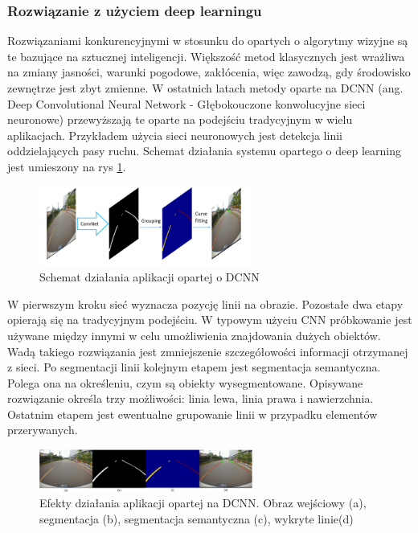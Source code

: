 \subsubsection{Rozwiązanie z użyciem deep learningu}
Rozwiązaniami konkurencyjnymi w stosunku do opartych o algorytmy wizyjne są te bazujące na sztucznej inteligencji. Większość metod klasycznych jest wrażliwa na zmiany jasności, warunki pogodowe, zakłócenia, więc zawodzą, gdy środowisko zewnętrze jest zbyt zmienne. 
W ostatnich latach metody oparte na DCNN (ang. Deep Convolutional Neural Network - Głębokouczone konwolucyjne sieci neuronowe) przewyższają te oparte na podejściu tradycyjnym w wielu aplikacjach. Przykładem użycia sieci neuronowych jest detekcja linii oddzielających pasy ruchu. Schemat działania systemu opartego o deep learning jest umieszony na rys \ref{fig:lane_detection3_cnn_general}.
\begin{figure}
  \centering
  \includegraphics[width=7cm]{img/lane_detection3_cnn_general.png}
  \caption{Schemat działania aplikacji opartej o DCNN\cite{T6}}
  \label{fig:lane_detection3_cnn_general}
\end{figure}
 W pierwszym kroku sieć wyznacza pozycję linii na obrazie. Pozostałe dwa etapy opierają się na tradycyjnym podejściu. W typowym użyciu CNN próbkowanie jest używane między innymi w celu umożliwienia znajdowania dużych obiektów. Wadą takiego rozwiązania jest zmniejszenie szczegółowości informacji otrzymanej z sieci.
Po segmentacji linii kolejnym etapem jest segmentacja semantyczna. Polega ona na określeniu, czym są obiekty wysegmentowane. Opisywane rozwiązanie określa trzy możliwości: linia lewa, linia prawa i nawierzchnia. Ostatnim etapem jest ewentualne grupowanie linii w przypadku elementów przerywanych.

\begin{figure}
  \centering
  \includegraphics[width=7cm]{img/lane_detection3_cnn_results.png}
  \caption{Efekty działania aplikacji opartej na DCNN. Obraz wejściowy (a), segmentacja (b), segmentacja semantyczna (c), wykryte linie(d)\cite{T6}}
  \label{fig:lane_detection3_cnn_results}
\end{figure}

